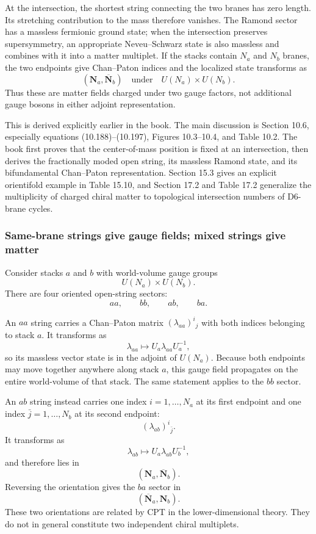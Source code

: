 \documentclass[
  10pt,
  a4paper,
  openany]{book}
\begin{document}
At the intersection, the shortest string connecting the two branes has
zero length. Its stretching contribution to the mass therefore vanishes.
The Ramond sector has a massless fermionic ground state; when the
intersection preserves supersymmetry, an appropriate Neveu--Schwarz
state is also massless and combines with it into a matter multiplet. If
the stacks contain \(N_a\) and \(N_b\) branes, the two endpoints give
Chan--Paton indices and the localized state transforms as \[
\boxed{
(\mathbf N_a,\overline{\mathbf N}_b)
\quad\text{under}\quad
U(N_a)\times U(N_b)
}.
\] Thus these are matter fields charged under two gauge factors, not
additional gauge bosons in either adjoint representation.

This is derived explicitly earlier in the book. The main discussion is
Section 10.6, especially equations (10.188)--(10.197), Figures
10.3--10.4, and Table 10.2. The book first proves that the
center-of-mass position is fixed at an intersection, then derives the
fractionally moded open string, its massless Ramond state, and its
bifundamental Chan--Paton representation. Section 15.3 gives an explicit
orientifold example in Table 15.10, and Section 17.2 and Table 17.2
generalize the multiplicity of charged chiral matter to topological
intersection numbers of D6-brane cycles.

\subsubsection{Same-brane strings give gauge fields; mixed strings give
matter}\label{same-brane-strings-give-gauge-fields-mixed-strings-give-matter}

Consider stacks \(a\) and \(b\) with world-volume gauge groups \[
U(N_a)\times U(N_b).
\] There are four oriented open-string sectors: \[
aa,\qquad bb,\qquad ab,\qquad ba.
\]

An \(aa\) string carries a Chan--Paton matrix \((\lambda_{aa})^i{}_j\)
with both indices belonging to stack \(a\). It transforms as \[
\lambda_{aa}\longmapsto
U_a\lambda_{aa}U_a^{-1},
\] so its massless vector state is in the adjoint of \(U(N_a)\). Because
both endpoints may move together anywhere along stack \(a\), this gauge
field propagates on the entire world-volume of that stack. The same
statement applies to the \(bb\) sector.

An \(ab\) string instead carries one index \(i=1,\ldots,N_a\) at its
first endpoint and one index \(\bar j=1,\ldots,N_b\) at its second
endpoint: \[
(\lambda_{ab})^i{}_{\bar j}.
\] It transforms as \[
\lambda_{ab}\longmapsto
U_a\lambda_{ab}U_b^{-1},
\] and therefore lies in \[
(\mathbf N_a,\overline{\mathbf N}_b).
\] Reversing the orientation gives the \(ba\) sector in \[
(\overline{\mathbf N}_a,\mathbf N_b).
\] These two orientations are related by CPT in the lower-dimensional
theory. They do not in general constitute two independent chiral
multiplets.
\end{document}
